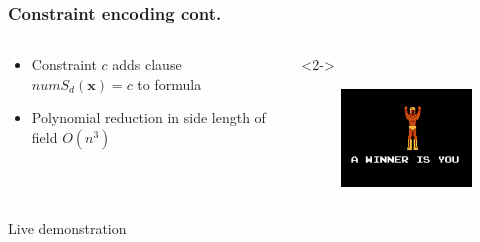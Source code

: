 \begin{frame}
	\frametitle{Constraint encoding cont.}
	\begin{columns}
		\begin{column}{6cm}
			\begin{itemize}
				\item Constraint $c$ adds clause $numS_{d}(\pmb x) = c$ to formula
				\item <2-> Polynomial reduction in side length of field $O(n^3)$
			\end{itemize}
		\end{column}
		\begin{column}{5cm}<2->
			\begin{figure}
				\centering
				\includegraphics[width=5cm]{images/win.jpg}
			\end{figure}
		\end{column}
	\end{columns}
\end{frame}

\begin{frame}
	\centering
	\hfill \Large Live demonstration \hfill\hfill
\end{frame}
